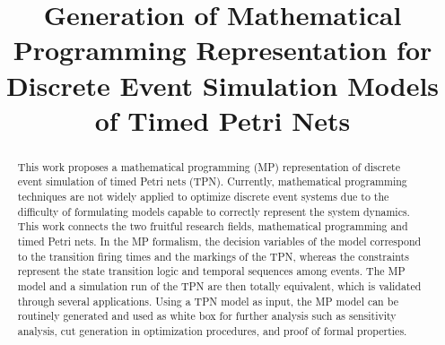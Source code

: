 \documentclass[suppldata]{interact}
\theoremstyle{plain}
\theoremstyle{definition}
\theoremstyle{remark}
\begin{document}
\author{
\medskip
{}
}


\title{\Large Generation of Mathematical Programming Representation for Discrete Event Simulation Models of Timed Petri Nets}

\maketitle

\bigskip
\begin{abstract}
This work proposes a mathematical programming (MP) representation of discrete event simulation of timed Petri nets (TPN). Currently, mathematical programming techniques are not widely applied to optimize discrete event systems due to the difficulty of formulating models capable to %
correctly represent the system dynamics. This work connects the two fruitful research fields, mathematical programming and timed Petri nets. In the MP formalism, the decision variables of the model %
correspond to the transition firing times and the markings of the TPN, whereas the constraints represent the state transition logic and temporal sequences among events. The MP model and a simulation run of the TPN are then totally equivalent, which is validated %
through several applications. Using a TPN model as input, the MP model can be routinely generated and used as white box for further analysis such as sensitivity analysis, cut generation in optimization procedures, and proof of formal properties.


\end{abstract}
\end{document}

